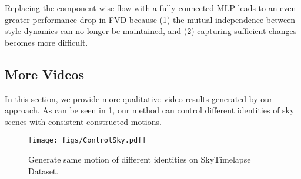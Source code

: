 Replacing the component-wise flow with a fully connected MLP leads to an even greater performance drop in FVD because (1) the mutual independence between style dynamics can no longer be maintained, and (2) capturing sufficient changes becomes more difficult.

\label{sec: ablation study}
\begin{table}[t]
    \centering
    \caption{Ablation study results for different configurations of GRU and component-wise flow on the FaceForensics dataset.}
    \label{tab:ablation}
\end{table}

\subsection{More Videos}
In this section, we provide more qualitative video results generated by our approach. As can be seen in \ref{fig:control_sky}, our method can control different identities of sky scenes with consistent constructed motions.
\begin{figure}[h]
    \centering
    \texttt{[image: figs/ControlSky.pdf]} 
    \caption{Generate same motion of different identities on SkyTimelapse Dataset.}
    \label{fig:control_sky}
\end{figure}


